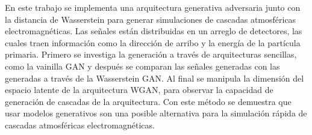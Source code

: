 \begin{extraAbstract}
\addchaptertocentry{\abstractname} 
En este trabajo se implementa una arquitectura generativa adversaria junto con la distancia de Wasserstein para generar simulaciones de cascadas atmosféricas electromagnéticas. Las señales están distribuidas en un arreglo de detectores, las cuales traen información como la dirección de arribo y la energía de la partícula primaria. Primero se investiga la generación a través de arquitecturas sencillas, como la vainilla GAN y después se comparan las señales generadas con las generadas a través de la Wasserstein GAN. Al final se manipula la dimensión del espacio latente de la arquitectura WGAN, para observar la capacidad de generación de cascadas de la arquitectura. Con este método se demuestra que usar modelos generativos son una posible alternativa para la simulación rápida de cascadas atmosféricas electromagnéticas. 
\end{extraAbstract}